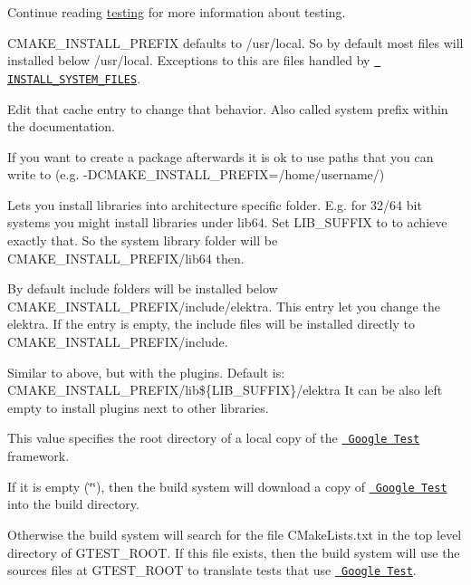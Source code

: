 Continue reading \mbox{\hyperlink{doc_TESTING_md}{testing}} for more information about testing.

{\ttfamily C\+M\+A\+K\+E\+\_\+\+I\+N\+S\+T\+A\+L\+L\+\_\+\+P\+R\+E\+F\+IX} defaults to {\ttfamily /usr/local}. So by default most files will installed below {\ttfamily /usr/local}. Exceptions to this are files handled by \href{\#install_system_files}{\texttt{ I\+N\+S\+T\+A\+L\+L\+\_\+\+S\+Y\+S\+T\+E\+M\+\_\+\+F\+I\+L\+ES}}.

Edit that cache entry to change that behavior. Also called system prefix within the documentation.

If you want to create a package afterwards it is ok to use paths that you can write to (e.\+g. {\ttfamily -\/D\+C\+M\+A\+K\+E\+\_\+\+I\+N\+S\+T\+A\+L\+L\+\_\+\+P\+R\+E\+F\+IX=/home/username/})

Lets you install libraries into architecture specific folder. E.\+g. for 32/64 bit systems you might install libraries under {\ttfamily lib64}. Set {\ttfamily L\+I\+B\+\_\+\+S\+U\+F\+F\+IX} to {} to achieve exactly that. So the system library folder will be {\ttfamily C\+M\+A\+K\+E\+\_\+\+I\+N\+S\+T\+A\+L\+L\+\_\+\+P\+R\+E\+F\+I\+X/lib64} then.

By default include folders will be installed below {\ttfamily C\+M\+A\+K\+E\+\_\+\+I\+N\+S\+T\+A\+L\+L\+\_\+\+P\+R\+E\+F\+I\+X/include/elektra}. This entry let you change the elektra. If the entry is empty, the include files will be installed directly to {\ttfamily C\+M\+A\+K\+E\+\_\+\+I\+N\+S\+T\+A\+L\+L\+\_\+\+P\+R\+E\+F\+I\+X/include}.

Similar to above, but with the plugins. Default is\+: {\ttfamily C\+M\+A\+K\+E\+\_\+\+I\+N\+S\+T\+A\+L\+L\+\_\+\+P\+R\+E\+F\+I\+X/lib\$\{L\+I\+B\+\_\+\+S\+U\+F\+F\+IX\}/elektra} It can be also left empty to install plugins next to other libraries.

This value specifies the root directory of a local copy of the \href{https://github.com/google/googletest}{\texttt{ Google Test}} framework.


\begin{DoxyItemize}
\item If it is empty ({\ttfamily \char`\"{}\char`\"{}}), then the build system will download a copy of \href{https://github.com/google/googletest}{\texttt{ Google Test}} into the build directory.
\item Otherwise the build system will search for the file {\ttfamily C\+Make\+Lists.\+txt} in the top level directory of {\ttfamily G\+T\+E\+S\+T\+\_\+\+R\+O\+OT}. If this file exists, then the build system will use the sources files at {\ttfamily G\+T\+E\+S\+T\+\_\+\+R\+O\+OT} to translate tests that use \href{https://github.com/google/googletest}{\texttt{ Google Test}}.
\end{DoxyItemize}

